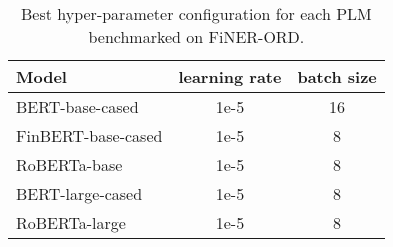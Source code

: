 \documentclass[11pt]{article}
\begin{document}


\begin{table}
\centering
\footnotesize
\begin{tabular}{lcc}
\hline
\textbf{Model} & \textbf{learning rate} & \textbf{batch size}\\
\hline
BERT-base-cased & 1e-5  & 16\\
FinBERT-base-cased & 1e-5 & 8\\
RoBERTa-base & 1e-5 &  8\\
BERT-large-cased & 1e-5 & 8\\
RoBERTa-large & 1e-5 &  8\\
\hline
\end{tabular}
\caption{Best hyper-parameter configuration for each PLM benchmarked on FiNER-ORD.}
\label{tb:plm_best_hyperparam_configs}
\end{table}
\end{document}
